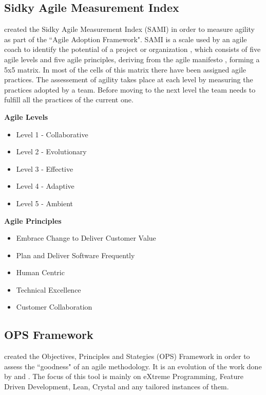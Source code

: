 \subsection{Sidky Agile Measurement Index} %
\citet{sidky_dissertation} created the Sidky Agile Measurement Index (SAMI) in order to measure agility as part of the ``Agile Adoption Framework". SAMI is a scale used by an agile coach to identify the potential of a project or organization \cite{sidky}, which consists of five agile levels and five agile principles, deriving from the agile manifesto \cite{beck2001agile}, forming a 5x5 matrix. In most of the cells of this matrix there have been assigned agile practices. The assessement of agility takes place at each level by measuring the practices adopted by a team. Before moving to the next level the team needs to fulfill all the practices of the current one.

\begin{minipage}[t]{0.35\linewidth}
    \textbf{Agile Levels}
    \begin{itemize}
    \item{Level 1 - Collaborative}
    \item{Level 2 - Evolutionary}
    \item{Level 3 - Effective}
    \item{Level 4 - Adaptive}
    \item{Level 5 - Ambient}
    \end{itemize}
    \end{minipage}
    \begin{minipage}[t]{0.6\linewidth}
    \textbf{Agile Principles}
    \begin{itemize}
    \item{Embrace Change to Deliver Customer Value}
    \item{Plan and Deliver Software Frequently}
    \item{Human Centric}
    \item{Technical Excellence}
    \item{Customer Collaboration}
    \end{itemize}
\end{minipage}


\subsection{OPS Framework}
\label{sec:ops}
\citet{sventha_dissertation} created the Objectives, Principles and Stategies (OPS) Framework in order to assess the ``goodness" of an agile methodology. It is an evolution of the work done by \citet{2604} and \citet{sidky_dissertation}. The focus of this tool is mainly on eXtreme Programming, Feature Driven Development, Lean, Crystal and any tailored instances of them.

